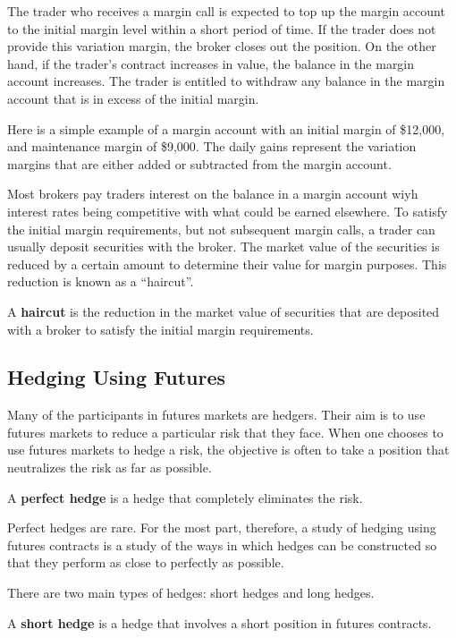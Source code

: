 The trader who receives a margin call is expected to top up the margin account to the initial margin level within a
short period of time. If the trader does not provide this variation margin, the broker closes out the position. On
the other hand, if the trader's contract increases in value, the balance in the margin account increases. The trader
is entitled to withdraw any balance in the margin account that is in excess of the initial margin.

\be
Here is a simple example of a margin account with an initial margin of \$12,000, and maintenance margin of \$9,000.
The daily gains represent the variation margins that are either added or subtracted from the margin account.
\ee

Most brokers pay traders interest on the balance in a margin account wiyh interest rates being competitive with what
could be earned elsewhere. To satisfy the initial margin requirements, but not subsequent margin calls, a trader can
usually deposit securities with the broker. The market value of the securities is reduced by a certain amount to
determine their value for margin purposes. This reduction is known as a ``haircut''.

\bd[Haircut]
A \textbf{haircut} is the reduction in the market value of securities that are deposited with a broker to satisfy the
initial margin requirements.
\ed

\subsection{Hedging Using Futures}

Many of the participants in futures markets are hedgers. Their aim is to use futures markets to reduce a particular
risk that they face. When one chooses to use futures markets to hedge a risk, the objective is often to take a
position that neutralizes the risk as far as possible.

A \textbf{perfect hedge} is a hedge that completely eliminates the risk.
\ed

Perfect hedges are rare. For the most part, therefore, a study of hedging using futures contracts is a study of the
ways in which hedges can be constructed so that they perform as close to perfectly as possible.

There are two main types of hedges: short hedges and long hedges.

A \textbf{short hedge} is a hedge that involves a short position in futures contracts.
\ed

